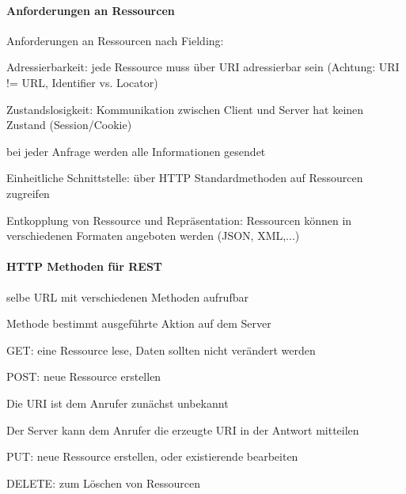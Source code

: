 \documentclass[10pt]{article}
\begin{document}
  \paragraph{Anforderungen an Ressourcen}
  
  Anforderungen an Ressourcen nach Fielding: 
  \begin{enumerate*}
    \item Adressierbarkeit: jede Ressource muss über URI adressierbar sein (Achtung: URI != URL, Identifier vs. Locator)
    \item Zustandslosigkeit: Kommunikation zwischen Client und Server hat keinen Zustand (Session/Cookie)
    \begin{itemize*}
      \item bei jeder Anfrage werden alle Informationen gesendet
    \end{itemize*}
    \item Einheitliche Schnittstelle: über HTTP Standardmethoden auf Ressourcen zugreifen
    \item Entkopplung von Ressource und Repräsentation: Ressourcen können in verschiedenen Formaten angeboten werden (JSON, XML,...)
  \end{enumerate*}
  
  \paragraph{HTTP Methoden für REST}
  
  \begin{itemize*}
    \item selbe URL mit verschiedenen Methoden aufrufbar
    \item Methode bestimmt ausgeführte Aktion auf dem Server
  \end{itemize*}
  \begin{itemize*}
    \item[GET:] eine Ressource lese, Daten sollten nicht verändert werden
    \item[POST:] neue Ressource erstellen
    \begin{itemize*}
      \item Die URI ist dem Anrufer zunächst unbekannt
      \item Der Server kann dem Anrufer die erzeugte URI in der Antwort mitteilen
    \end{itemize*}
    \item[PUT:] neue Ressource erstellen, oder existierende bearbeiten
    \item[DELETE:] zum Löschen von Ressourcen
  \end{itemize*}
  
\end{document}
